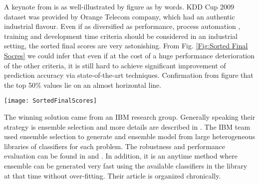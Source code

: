 \documentclass[journal]{IEEEtran}
\begin{document}
A keynote from \cite{Ref:AnalysisOfTheKDDCup2009} is as well-illustrated by figure as by words. KDD Cup 2009 dataset was provided by Orange Telecom company, which had an authentic industrial flavour. Even if as diversified as performance, process automation , training and development time criteria should be considered in an industrial setting, the sorted final scores are very astonishing. From Fig. \ref{Fig:Sorted Final Socres} we could infer that even if at the cost of a huge performance deterioration of the other criteria, it is still hard to achieve significant improvement of prediction accuracy via state-of-the-art techniques. Confirmation from figure that the top 50\% values lie on an almost horizontal line.
\begin{figure*}[!t]
\centering
\texttt{[image: SortedFinalScores]}
\caption{\textbf{Sorted final scores:} The sorted AUC values on the test set of each three classes, together with the average of AUC on the three tasks. Only final submissions are included. Source: \cite{Ref:AnalysisOfTheKDDCup2009}.}
\label{Fig:Sorted Final Socres}
\vspace*{4pt}
\end{figure*}
\par
The winning solution came from an IBM research group. Generally speaking their strategy is ensemble selection and more details are described in \cite{Ref:WinningtheKDDCupIBMResearch}. The IBM team used ensemble selection \cite{Ref:EnsembleSelectionFromLibraryOfModels} to generate and ensemble model from large heterogeneous libraries of classifiers for each problem. The robustness and performance evaluation can be found in \cite{Ref:EnsembleMethodsInMachineLearning} and \cite{Ref:AnEmpiricalComparisonofVotingClassification}. In addition, it is an anytime method where ensemble can be generated very fast using the available classifiers in the library at that time without over-fitting. Their article is organized chronically.
\end{document}

